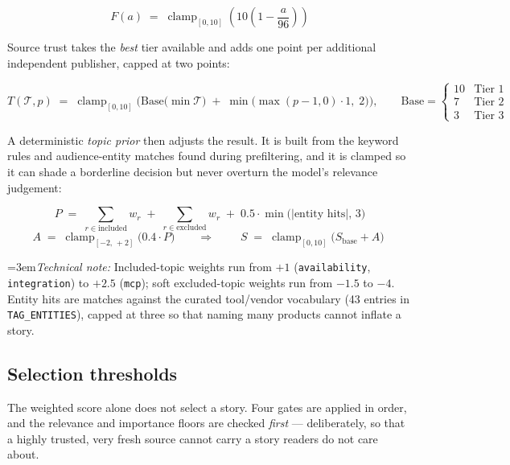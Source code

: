\documentclass[11pt,a4paper]{article}
\newcommand{\brk}{\hyphenpenalty=0\exhyphenpenalty=0\relax}
\newcommand{\code}[1]{\texttt{\small\brk #1}}
\newcommand{\technote}[1]{\par\vspace{-0.25em}\begingroup\footnotesize\color{aitkGray}\sloppy\emergencystretch=3em\textit{Technical note:} #1\par\endgroup}
\begin{document}
\begin{equation}
F(a) \;=\; \operatorname{clamp}_{[0,10]}\!\left( 10\left(1 - \frac{a}{96}\right)\right)
\end{equation}

Source trust takes the \emph{best} tier available and adds one point per
additional independent publisher, capped at two points:

\begin{equation}
T(\mathcal{T}, p) \;=\; \operatorname{clamp}_{[0,10]}\!\Big(
  \mathrm{Base}\big(\min \mathcal{T}\big) \;+\; \min\big(\max(p-1,0)\cdot 1,\; 2\big)\Big),
\qquad
\mathrm{Base} = \begin{cases} 10 & \text{Tier 1}\\ 7 & \text{Tier 2}\\ 3 & \text{Tier 3}\end{cases}
\end{equation}

A deterministic \emph{topic prior} then adjusts the result. It is built from the
keyword rules and audience-entity matches found during prefiltering, and it is
clamped so it can shade a borderline decision but never overturn the model's
relevance judgement:

\begin{equation}
P \;=\; \sum_{r \in \text{included}} w_r \;+\; \sum_{r \in \text{excluded}} w_r
        \;+\; 0.5 \cdot \min\big(|\text{entity hits}|,\,3\big)
\end{equation}
\begin{equation}
A \;=\; \operatorname{clamp}_{[-2,\,+2]}\big(0.4 \cdot P\big)
\qquad\Longrightarrow\qquad
\boxed{\;S \;=\; \operatorname{clamp}_{[0,10]}\big(S_{\text{base}} + A\big)\;}
\end{equation}

\technote{Included-topic weights run from $+1$ (\code{availability},
\code{integration}) to $+2.5$ (\code{mcp}); soft excluded-topic weights run from
$-1.5$ to $-4$. Entity hits are matches against the curated tool/vendor
vocabulary (43 entries in \code{TAG\_ENTITIES}), capped at three so that naming
many products cannot inflate a story.}

\subsection{Selection thresholds}

The weighted score alone does not select a story. Four gates are applied in
order, and the relevance and importance floors are checked \emph{first} ---
deliberately, so that a highly trusted, very fresh source cannot carry a story
readers do not care about.
\end{document}
